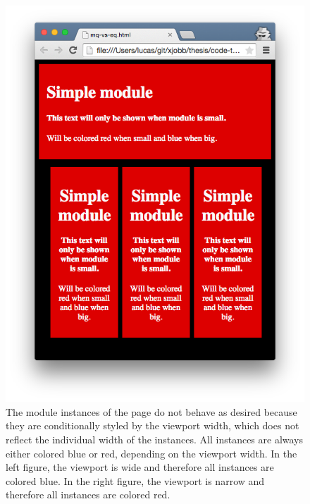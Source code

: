 \documentclass[a4paper,11pt]{kth-mag}
\begin{document}
\begin{figure}[ht]
\begin{minipage}{.5\textwidth}
            \includegraphics[width=\linewidth]{images/mq-small}
          \end{minipage}
          \caption{
            The module instances of the page do not behave as desired because they are conditionally styled by the \gls{viewport} width, which does not reflect the individual width of the instances.
            All instances are always either colored blue or red, depending on the \gls{viewport} width.
            In the left figure, the \gls{viewport} is wide and therefore all instances are colored blue.
            In the right figure, the \gls{viewport} is narrow and therefore all instances are colored red.
          }
          \label{fig:problem-mq}
        \end{figure}
\end{document}
